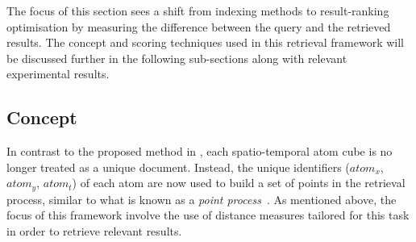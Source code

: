 The focus of this section sees a shift from indexing methods to result-ranking optimisation by measuring the difference between the query and the retrieved
results. The concept and scoring techniques used in this retrieval framework will be discussed further in the following sub-sections along with relevant experimental results.

\subsection{Concept}

In contrast to the proposed method in \versionOneRet, each spatio-temporal atom cube is no longer treated as a unique document. Instead, the unique identifiers ($atom_x$, $atom_y$, $atom_t$) of each atom are now used to build a set of points in the retrieval process, similar to what is known as a \emph{point process}~\cite{diggle2013statistical}. As mentioned above, the focus of this
framework involve the use of distance measures 
tailored for this task in order to retrieve
relevant results.


